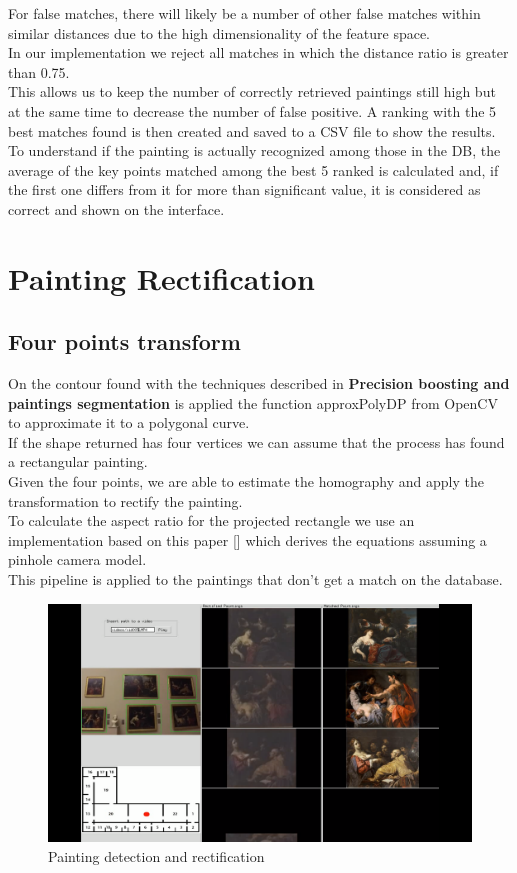 \documentclass[conference]{IEEEtran}
\begin{document}
For false matches, there will likely be a number of other false matches within similar distances due to the high dimensionality of the feature space.\\
In our implementation we reject all matches in which the distance ratio is greater than 0.75.\\
This allows us to keep the number of correctly retrieved paintings still high but at the same time to decrease the number of false positive.
A ranking with the 5 best matches found is then created and saved to a CSV file to show the results.\\
To understand if the painting is actually recognized among those in the DB, the average of the key points matched among the best 5 ranked is calculated and, if the first one differs from it for more than significant value, it is considered as correct and shown on the interface.\\


\section{Painting Rectification}
\subsection{Four points transform}
On the contour found with the techniques described in \textbf{Precision boosting and paintings segmentation} is applied the function approxPolyDP from OpenCV to approximate it to a polygonal curve.\\
If the shape returned has four vertices we can assume that the process has found a rectangular painting.\\
Given the four points, we are able to estimate the homography and apply the transformation to rectify the painting.\\
To calculate the aspect ratio for the projected rectangle we use an implementation based on this paper [] which derives the equations assuming a pinhole camera model.\\
This pipeline is applied to the paintings that don't get a match on the database.

\begin{figure}[htbp]
\centerline{\includegraphics[width=0.8\columnwidth]{../detection_and_rectification/top_association_vid05.png}}
\caption{Painting detection and rectification}
\label{fig_Painting_detection_and_rectification}
\end{figure}
\end{document}
